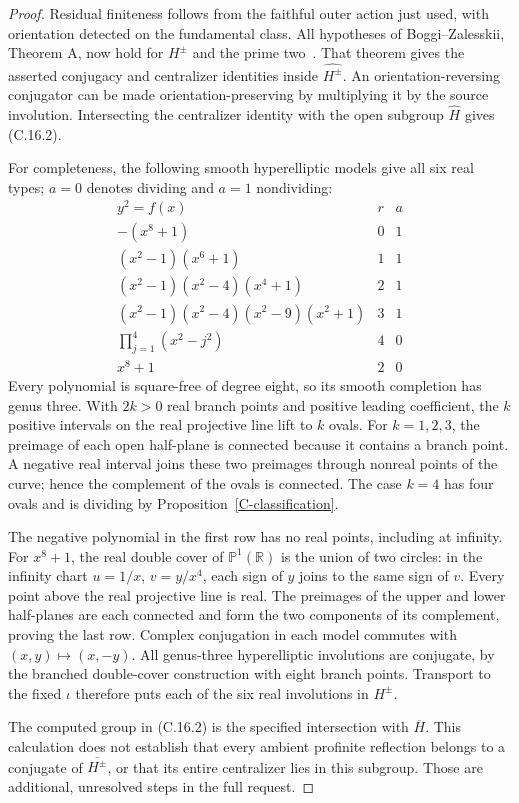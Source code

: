 \documentclass[11pt,oneside]{article}
\begin{document}
\begin{proof}
Residual finiteness follows from the faithful outer action
just used, with orientation detected on the fundamental
class. All hypotheses of Boggi--Zalesskii, Theorem A, now
hold for $H^{\pm}$ and the prime two~\cite{BoggiZalesskii2024}.
That theorem gives the asserted conjugacy and centralizer
identities inside $\widehat{H^{\pm}}$. An
orientation-reversing conjugator can be made
orientation-preserving by multiplying it by the source
involution. Intersecting the centralizer identity with the
open subgroup $\widehat H$ gives (C.16.2).

For completeness, the following smooth hyperelliptic models
give all six real types; $a=0$ denotes dividing and $a=1$
nondividing:
\[
\begin{array}{c|c|c}
 y^2=f(x)&r&a\\ \hline
 -(x^8+1)&0&1\\
 (x^2-1)(x^6+1)&1&1\\
 (x^2-1)(x^2-4)(x^4+1)&2&1\\
 (x^2-1)(x^2-4)(x^2-9)(x^2+1)&3&1\\
 \prod_{j=1}^{4}(x^2-j^2)&4&0\\
 x^8+1&2&0
\end{array}
\tag{C.16.4}
\]
Every polynomial is square-free of degree eight, so its smooth
completion has genus three. With $2k>0$ real branch points
and positive leading coefficient, the $k$ positive intervals
on the real projective line lift to $k$ ovals. For
$k=1,2,3$, the preimage of each open half-plane is connected
because it contains a branch point. A negative real interval
joins these two preimages through nonreal points of the curve;
hence the complement of the ovals is connected. The case
$k=4$ has four ovals and is dividing by
Proposition~\ref{C-classification}.

The negative polynomial in the first row has no real points,
including at infinity. For $x^8+1$, the real double cover of
$\mathbb P^1(\mathbb R)$ is the union of two circles: in the
infinity chart $u=1/x$, $v=y/x^4$, each sign of $y$ joins to
the same sign of $v$. Every point above the real projective
line is real. The preimages of the upper and lower half-planes
are each connected and form the two components of its
complement, proving the last row. Complex conjugation in
each model commutes with $(x,y)\mapsto(x,-y)$. All genus-three
hyperelliptic involutions are conjugate, by the branched
double-cover construction with eight branch points. Transport
to the fixed $\iota$ therefore puts each of the six real
involutions in $H^{\pm}$.

The computed group in (C.16.2) is the specified intersection
with $\overline H$. This calculation does not establish that
every ambient profinite reflection belongs to a conjugate
of $\overline{H^{\pm}}$, or that its entire centralizer lies
in this subgroup. Those are additional, unresolved steps
in the full request.
\end{proof}
\end{document}
